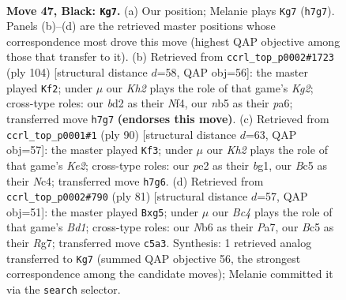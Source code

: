 \documentclass[11pt]{article}
\begin{document}
\clearpage

\begin{figure}[p]\centering
\begin{subfigure}{0.46\textwidth}\centering
\resizebox{\linewidth}{!}{%
\newchessgame
\chessboard[
  setfen={1nb5/1p5k/1n6/pNbp2p1/7p/PP2P2P/3BP2K/3B4 b - - 7 47},
  showmover=false,
  pgfstyle=straightmove, color=movearrow, markmove={h7-g7}
]}
\caption{}
\end{subfigure}\hfill
\begin{subfigure}{0.46\textwidth}\centering
\resizebox{\linewidth}{!}{%
\newchessgame
\chessboard[
  setfen={8/4k1p1/p1bn1pP1/1p1p1p2/1P1P1N2/P2BP3/6K1/8 w - - 7 53},
  showmover=false,
  pgfstyle=straightmove, color=movearrow, markmove={g2-f2}
]}
\caption{}
\end{subfigure}
\\[4pt]
\begin{subfigure}{0.46\textwidth}\centering
\resizebox{\linewidth}{!}{%
\newchessgame
\chessboard[
  setfen={4b3/4k1p1/1p2p3/pP2P2p/P1N1Bp1P/8/4K1P1/6b1 w - - 1 46},
  showmover=false,
  pgfstyle=straightmove, color=movearrow, markmove={e2-f3}
]}
\caption{}
\end{subfigure}\hfill
\begin{subfigure}{0.46\textwidth}\centering
\resizebox{\linewidth}{!}{%
\newchessgame
\chessboard[
  setfen={3bk3/pb4r1/1p1p4/1P1Pp1Pp/4P3/PK4P1/8/1NB4R b - - 4 41},
  showmover=false,
  pgfstyle=straightmove, color=movearrow, markmove={d8-g5}
]}
\caption{}
\end{subfigure}
\caption{\textbf{Move 47, Black: \texttt{Kg7}.} (a) Our position; Melanie plays \texttt{Kg7} (\texttt{h7g7}). Panels (b)--(d) are the retrieved master positions whose correspondence most drove this move (highest QAP objective among those that transfer to it). (b) Retrieved from \texttt{ccrl\_top\_p0002\#1723} (ply 104) [structural distance $d$=58, QAP obj=56]: the master played \texttt{Kf2}; under $\mu$ our \emph{Kh2} plays the role of that game's \emph{Kg2}; cross-type roles: our \emph{b}d2 as their \emph{N}f4, our \emph{n}b5 as their \emph{p}a6; transferred move \texttt{h7g7} \textbf{(endorses this move)}. (c) Retrieved from \texttt{ccrl\_top\_p0001\#1} (ply 90) [structural distance $d$=63, QAP obj=57]: the master played \texttt{Kf3}; under $\mu$ our \emph{Kh2} plays the role of that game's \emph{Ke2}; cross-type roles: our \emph{p}e2 as their \emph{b}g1, our \emph{B}c5 as their \emph{N}c4; transferred move \texttt{h7g6}. (d) Retrieved from \texttt{ccrl\_top\_p0002\#790} (ply 81) [structural distance $d$=57, QAP obj=51]: the master played \texttt{Bxg5}; under $\mu$ our \emph{Bc4} plays the role of that game's \emph{Bd1}; cross-type roles: our \emph{N}b6 as their \emph{P}a7, our \emph{B}c5 as their \emph{R}g7; transferred move \texttt{c5a3}. Synthesis: 1 retrieved analog transferred to \texttt{Kg7} (summed QAP objective 56, the strongest correspondence among the candidate moves); Melanie committed it via the \texttt{search} selector.}
\label{fig:thought-m93}
\end{figure}
\end{document}
